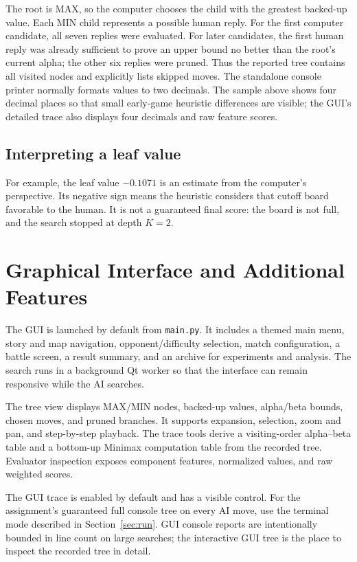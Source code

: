 \documentclass[11pt,a4paper]{article}
\begin{document}
The root is MAX, so the computer chooses the child with the greatest backed-up
value. Each MIN child represents a possible human reply. For the first
computer candidate, all seven replies were evaluated. For later candidates,
the first human reply was already sufficient to prove an upper bound no better
than the root's current alpha; the other six replies were pruned. Thus the
reported tree contains all visited nodes and explicitly lists skipped moves.
The standalone console printer normally formats values to two decimals. The
sample above shows four decimal places so that small early-game heuristic
differences are visible; the GUI's detailed trace also displays four decimals
and raw feature scores.

\subsection{Interpreting a leaf value}
For example, the leaf value $-0.1071$ is an estimate from the computer's
perspective. Its negative sign means the heuristic considers that cutoff board
favorable to the human. It is not a guaranteed final score: the board is not
full, and the search stopped at depth $K=2$.

\section{Graphical Interface and Additional Features}

The GUI is launched by default from \texttt{main.py}. It includes a themed
main menu, story and map navigation, opponent/difficulty selection, match
configuration, a battle screen, a result summary, and an archive for
experiments and analysis. The search runs in a background Qt worker so that
the interface can remain responsive while the AI searches.

The tree view displays MAX/MIN nodes, backed-up values, alpha/beta bounds,
chosen moves, and pruned branches. It supports expansion, selection, zoom and
pan, and step-by-step playback. The trace tools derive a visiting-order
alpha--beta table and a bottom-up Minimax computation table from the recorded
tree. Evaluator inspection exposes component features, normalized values,
and raw weighted scores.

The GUI trace is enabled by default and has a visible control. For the
assignment's guaranteed full console tree on every AI move, use the terminal
mode described in Section~\ref{sec:run}. GUI console reports are intentionally
bounded in line count on large searches; the interactive GUI tree is the place
to inspect the recorded tree in detail.
\end{document}
